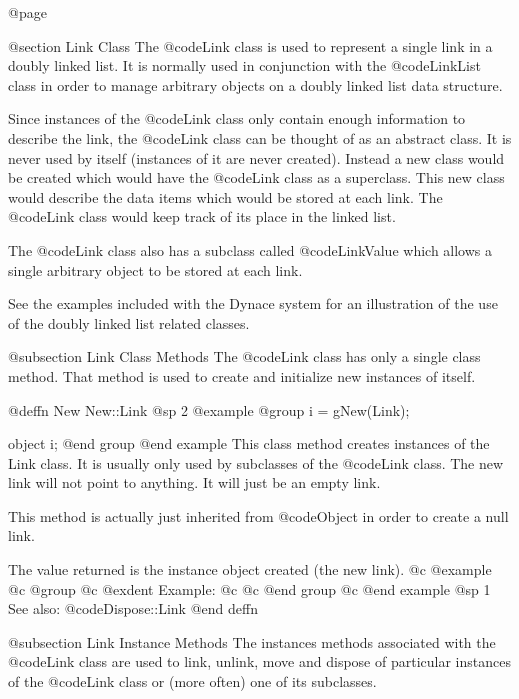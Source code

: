 @page

@section Link Class
The @code{Link} class is used to represent a single link in a doubly
linked list.  It is normally used in conjunction with the
@code{LinkList} class in order to manage arbitrary objects on a doubly
linked list data structure.

Since instances of the @code{Link} class only contain enough information
to describe the link, the @code{Link} class can be thought of as an
abstract class.  It is never used by itself (instances of it are never
created).  Instead a new class would be created which would have the
@code{Link} class as a superclass.  This new class would describe
the data items which would be stored at each link.  The @code{Link}
class would keep track of its place in the linked list.

The @code{Link} class also has a subclass called @code{LinkValue} which
allows a single arbitrary object to be stored at each link.

See the examples included with the Dynace system for an illustration of the
use of the doubly linked list related classes.


@subsection Link Class Methods
The @code{Link} class has only a single class method.  That method is used
to create and initialize new instances of itself.




@deffn {New} New::Link
@sp 2
@example
@group
i = gNew(Link);

object  i;
@end group
@end example
This class method creates instances of the Link class.  It is usually
only used by subclasses of the @code{Link} class.  The new link
will not point to anything.  It will just be an empty link.

This method is actually just inherited from @code{Object} in order
to create a null link.

The value returned is the instance object created (the new link).
@c @example
@c @group
@c @exdent Example:
@c 
@c @end group
@c @end example
@sp 1
See also:  @code{Dispose::Link}
@end deffn





@subsection Link Instance Methods
The instances methods associated with the @code{Link} class are used to
link, unlink, move and dispose of particular instances of the
@code{Link} class or (more often) one of its subclasses.
















